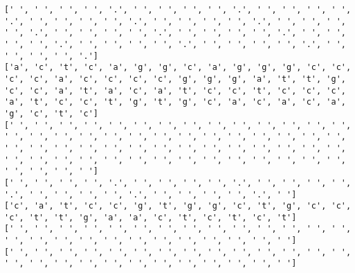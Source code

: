 \documentclass{article}
\begin{document}
\begin{Verbatim}
[' ', ' ', ' ', ' ', '.', ' ', ' ', ' ', ' ', '.', ' ', ' ', ' ', ' ', '.', ' ', ' ', ' ', ' ', '.', ' ', ' ', ' ', ' ', '.', ' ', ' ', ' ', ' ', '.', ' ', ' ', ' ', ' ', '.', ' ', ' ', ' ', ' ', '.', ' ', ' ', ' ', ' ', '.', ' ', ' ', ' ', ' ', '.', ' ', ' ', ' ', ' ', '.', ' ', ' ', ' ', ' ', '.']
['a', 'c', 't', 'c', 'a', 'g', 'g', 'c', 'a', 'g', 'g', 'g', 'c', 'c', 'c', 'c', 'a', 'c', 'c', 'c', 'c', 'g', 'g', 'g', 'a', 't', 't', 'g', 'c', 'c', 'a', 't', 'a', 'c', 'a', 't', 'c', 'c', 't', 'c', 'c', 'c', 'a', 't', 'c', 'c', 't', 'g', 't', 'g', 'c', 'a', 'c', 'a', 'c', 'a', 'g', 'c', 't', 'c']
[' ', ' ', ' ', ' ', ' ', ' ', ' ', ' ', ' ', ' ', ' ', ' ', ' ', ' ', ' ', ' ', ' ', ' ', ' ', ' ', ' ', ' ', ' ', ' ', ' ', ' ', ' ', ' ', ' ', ' ', ' ', ' ', ' ', ' ', ' ', ' ', ' ', ' ', ' ', ' ', ' ', ' ', ' ', ' ', ' ', ' ', ' ', ' ', ' ', ' ', ' ', ' ', ' ', ' ', ' ', ' ', ' ', ' ', ' ', ' ']
[' ', ' ', ' ', ' ', '.', ' ', ' ', ' ', ' ', '.', ' ', ' ', ' ', ' ', '.', ' ', ' ', ' ', ' ', '.', ' ', ' ', ' ', ' ', '.', ' ']
['c', 'a', 't', 'c', 'c', 'g', 't', 'g', 'g', 'c', 't', 'g', 'c', 'c', 'c', 't', 't', 'g', 'a', 'a', 'c', 't', 'c', 't', 'c', 't']
[' ', ' ', ' ', ' ', ' ', ' ', ' ', ' ', ' ', ' ', ' ', ' ', ' ', ' ', ' ', ' ', ' ', ' ', ' ', ' ', ' ', ' ', ' ', ' ', ' ', ' ']
[' ', ' ', ' ', ' ', ' ', ' ', ' ', ' ', ' ', ' ', ' ', ' ', ' ', ' ', ' ', ' ', ' ', ' ', ' ', ' ', ' ', ' ', ' ', ' ', ' ', ' ']
 

\end{Verbatim}
\end{document}
